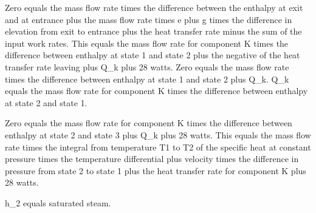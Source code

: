 Zero equals the mass flow rate times the difference between the enthalpy at exit and at entrance plus the mass flow rate times e plus g times the difference in elevation from exit to entrance plus the heat transfer rate minus the sum of the input work rates. This equals the mass flow rate for component K times the difference between enthalpy at state 1 and state 2 plus the negative of the heat transfer rate leaving plus Q_k plus 28 watts. Zero equals the mass flow rate times the difference between enthalpy at state 1 and state 2 plus Q_k. Q_k equals the mass flow rate for component K times the difference between enthalpy at state 2 and state 1.

Zero equals the mass flow rate for component K times the difference between enthalpy at state 2 and state 3 plus Q_k plus 28 watts. This equals the mass flow rate times the integral from temperature T1 to T2 of the specific heat at constant pressure times the temperature differential plus velocity times the difference in pressure from state 2 to state 1 plus the heat transfer rate for component K plus 28 watts.

h_2 equals saturated steam.